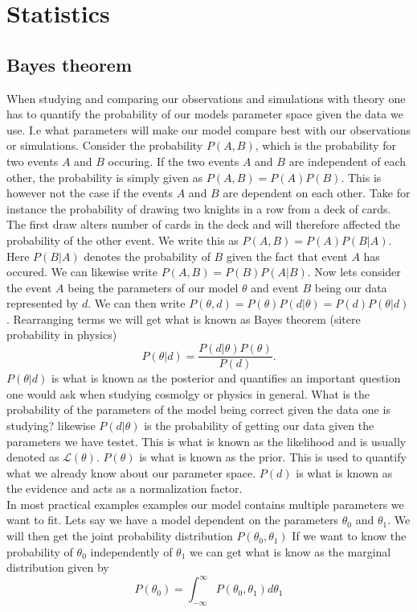 \section{Statistics}
\subsection{Bayes theorem}
When studying and comparing our observations and simulations with theory one has
to quantify the probability of our models parameter space given the data we use.
I.e what parameters will make our model compare best with our observations or
simulations. Consider the probability $P(A, B)$, which is the probability for two events $A$ and $B$ occuring.
If the two events $A$ and $B$ are independent of each other, the probability is simply given as $P(A, B) = P(A)P(B)$.
This is however not the case if the events $A$ and $B$ are dependent on each other. Take for instance the probability
of drawing two knights in a row from a deck of cards. The first draw alters number of cards in the deck and will therefore affected
the probability of the other event. We write this as $P(A,B) = P(A)P(B\vert A)$. Here $P(B\vert A)$ denotes the probability of $B$ given the fact that 
event $A$ has occured. We can likewise write $P(A,B) = P(B)P(A\vert B)$. Now lets consider the event $A$ being the parameters of our model $\theta$ and
event $B$ being our data represented by $d$. We can then write $P(\theta,d) = P(\theta)P(d\vert \theta)=P(d)P(\theta\vert d)$. Rearranging terms we will get
what is known as Bayes theorem (sitere probability in physics)
\begin{equation}\label{eq:bayes}
    P(\theta\vert d) = \frac{P(d\vert \theta)P(\theta)}{P(d)}.
\end{equation}
$P(\theta\vert d)$ is what is known as the posterior and quantifies an
important question one would ask when studying cosmolgy or physics in general. What is the probability
of the parameters of the model being correct given the data one is studying? likewise $P(d\vert\theta)$ is the
probability of getting our data given the parameters we have testet. This is what is known as
the likelihood and is usually denoted as $\mathcal{L}(\theta)$. $P(\theta)$ is what is
known as the prior. This is used to quantify what we already know about our
parameter space. $P(d)$ is what is known as the evidence and acts as a
normalization factor. \\

In most practical examples examples our model contains multiple parameters we want to fit. Lets say we have a model
dependent on the parameters $\theta_0$ and $\theta_1$. We will then get the joint probability distribution $P(\theta_0, \theta_1)$
If we want to know the probability of $\theta_0$ independently of $\theta_1$ we can get what is know as the marginal distribution given by
\begin{equation}
    P(\theta_0)=\int_{-\infty}^{\infty}P(\theta_0, \theta_1)d\theta_1
\end{equation}

